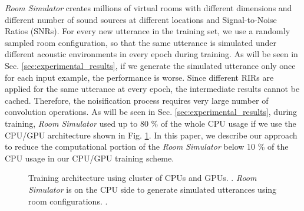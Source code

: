 \documentclass[a4paper]{article}
\begin{document}
\textit{Room Simulator} creates millions of virtual rooms
with different dimensions and different number of sound sources
at different locations and Signal-to-Noise Ratios (SNRs).
For every new utterance in the training set, we use a randomly
sampled room configuration, so that the same utterance
is simulated under different acoustic environments in every epoch during training.
As will be seen in Sec. \ref{sec:experimental_results}, if
we generate the simulated utterance only once for each
input example, the performance is worse.
Since different RIRs are applied for the same
utterance at every epoch, the intermediate results cannot be cached.
Therefore, the noisification process requires very large number of convolution operations. As will be seen
in Sec. \ref{sec:experimental_results}, during training, \textit{Room Simulator} used up to 80 \%
of the whole CPU usage if we use the CPU/GPU architecture
shown in Fig. \ref{fig:gpu_cpu_structure}.
In this paper, we describe our approach to reduce the
computational portion of the \textit{Room Simulator} below 10 \% of the CPU usage
in our CPU/GPU training scheme.
%
%
%
%
%
\begin{figure}%
  \begin{center}
    \resizebox{75mm}{!}{}
      \caption {
        \label{fig:gpu_cpu_structure}
        Training architecture using cluster of CPUs and GPUs.
        \cite{E_Variani_INTERSPEECH_2017_01}.
        \textit{Room Simulator} is on the CPU side to generate
        simulated utterances using room configurations.
        \cite{C_Kim_INTERSPEECH_2017_1}.}
  \end{center}
\vspace{-10mm}
\end{figure}
%
%
%
%
\end{document}
